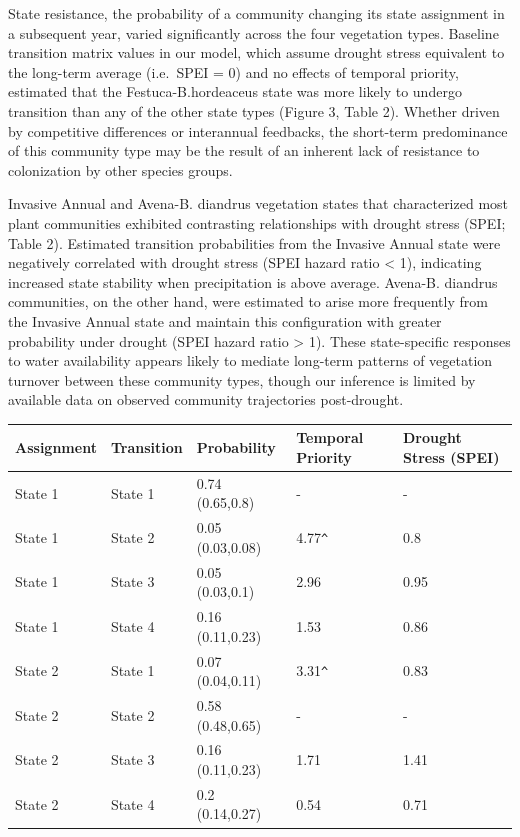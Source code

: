 \documentclass[twoside,12pt,final]{ucthesis-CA2012}
\begin{document}
\begin{ucmainmatter}
\begin{figure}
\end{figure}
State resistance, the probability of a community changing its state assignment in a subsequent year, varied significantly across the four vegetation types.
Baseline transition matrix values in our model, which assume drought stress equivalent to the long-term average (i.e.~SPEI = 0) and no effects of temporal priority, estimated that the Festuca-B.hordeaceus state was more likely to undergo transition than any of the other state types (Figure 3, Table 2).
Whether driven by competitive differences or interannual feedbacks, the short-term predominance of this community type may be the result of an inherent lack of resistance to colonization by other species groups.

Invasive Annual and Avena-B. diandrus vegetation states that characterized most plant communities exhibited contrasting relationships with drought stress (SPEI; Table 2).
Estimated transition probabilities from the Invasive Annual state were negatively correlated with drought stress (SPEI hazard ratio \textless{} 1), indicating increased state stability when precipitation is above average.
Avena-B. diandrus communities, on the other hand, were estimated to arise more frequently from the Invasive Annual state and maintain this configuration with greater probability under drought (SPEI hazard ratio \textgreater{} 1).
These state-specific responses to water availability appears likely to mediate long-term patterns of vegetation turnover between these community types, though our inference is limited by available data on observed community trajectories post-drought.
\begin{table}[ht]
\centering
\begin{tabular}{lllll}
  \hline
Assignment & Transition & Probability & Temporal Priority & Drought Stress (SPEI) \\ 
  \hline
State 1 & State 1 & 0.74 (0.65,0.8) & - & - \\ 
  State 1 & State 2 & 0.05 (0.03,0.08) & 4.77\verb|^| & 0.8 \\ 
  State 1 & State 3 & 0.05 (0.03,0.1) & 2.96 & 0.95 \\ 
  State 1 & State 4 & 0.16 (0.11,0.23) & 1.53 & 0.86 \\ 
  State 2 & State 1 & 0.07 (0.04,0.11) & 3.31\verb|^| & 0.83 \\ 
  State 2 & State 2 & 0.58 (0.48,0.65) & - & - \\ 
  State 2 & State 3 & 0.16 (0.11,0.23) & 1.71 & 1.41 \\ 
  State 2 & State 4 & 0.2 (0.14,0.27) & 0.54 & 0.71 \\ 

\end{tabular}
\end{table}
\end{ucmainmatter}
\end{document}
